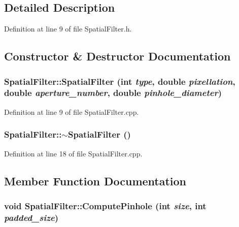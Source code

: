\subsection{Detailed Description}


Definition at line 9 of file SpatialFilter.h.



\subsection{Constructor \& Destructor Documentation}
\hypertarget{classSpatialFilter_ac08f42ea89b706f9c9fbca1ce7a40332}{
\subsubsection[{SpatialFilter}]{\setlength{\rightskip}{0pt plus 5cm}SpatialFilter::SpatialFilter (int {\em type}, \/  double {\em pixellation}, \/  double {\em aperture\_\-number}, \/  double {\em pinhole\_\-diameter})}}
\label{classSpatialFilter_ac08f42ea89b706f9c9fbca1ce7a40332}


Definition at line 9 of file SpatialFilter.cpp.

\hypertarget{classSpatialFilter_a6859e45eb9f92ca7eba0e4e4817479de}{
\subsubsection[{$\sim$SpatialFilter}]{\setlength{\rightskip}{0pt plus 5cm}SpatialFilter::$\sim$SpatialFilter ()}}
\label{classSpatialFilter_a6859e45eb9f92ca7eba0e4e4817479de}


Definition at line 18 of file SpatialFilter.cpp.



\subsection{Member Function Documentation}
\hypertarget{classSpatialFilter_a584f2516f5bd3e9ce6c805534efe701b}{
\subsubsection[{ComputePinhole}]{\setlength{\rightskip}{0pt plus 5cm}void SpatialFilter::ComputePinhole (int {\em size}, \/  int {\em padded\_\-size})}}
\label{classSpatialFilter_a584f2516f5bd3e9ce6c805534efe701b}


